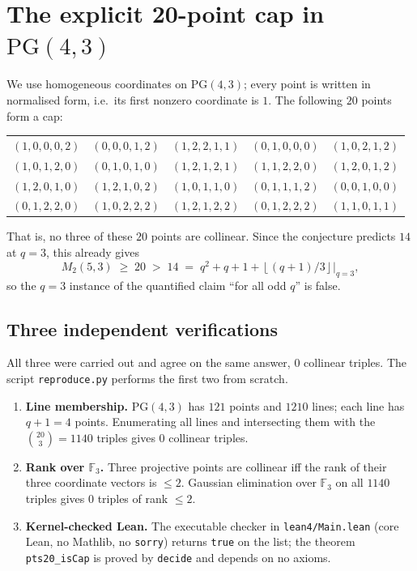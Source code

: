 \documentclass[11pt]{article}
\theoremstyle{definition}
\theoremstyle{remark}
\newcommand{\F}{\mathbb{F}}
\newcommand{\PG}{\mathrm{PG}}
\newcommand{\floor}[1]{\left\lfloor #1 \right\rfloor}
\begin{document}
\section{The explicit 20-point cap in $\PG(4,3)$}

We use homogeneous coordinates on $\PG(4,3)$; every point is written in
normalised form, i.e.\ its first nonzero coordinate is $1$. The following
$20$ points form a cap:
\begin{center}
\small
\begin{tabular}{lllll}
\toprule
$(1,0,0,0,2)$ & $(0,0,0,1,2)$ & $(1,2,2,1,1)$ & $(0,1,0,0,0)$ & $(1,0,2,1,2)$\\
$(1,0,1,2,0)$ & $(0,1,0,1,0)$ & $(1,2,1,2,1)$ & $(1,1,2,2,0)$ & $(1,2,0,1,2)$\\
$(1,2,0,1,0)$ & $(1,2,1,0,2)$ & $(1,0,1,1,0)$ & $(0,1,1,1,2)$ & $(0,0,1,0,0)$\\
$(0,1,2,2,0)$ & $(1,0,2,2,2)$ & $(1,2,1,2,2)$ & $(0,1,2,2,2)$ & $(1,1,0,1,1)$\\
\bottomrule
\end{tabular}
\end{center}

That is, no three of these $20$ points are collinear. Since the conjecture
predicts $14$ at $q=3$, this already gives
\[
M_{2}(5,3)\;\ge\;20\;>\;14\;=\;q^{2}+q+1+\floor{(q+1)/3}\big|_{q=3},
\]
so the $q=3$ instance of the quantified claim ``for all odd $q$'' is false.

\subsection{Three independent verifications}

All three were carried out and agree on the same answer, $0$ collinear
triples. The script \texttt{reproduce.py} performs the first two from scratch.

\begin{enumerate}
\item \textbf{Line membership.} $\PG(4,3)$ has $121$ points and $1210$ lines;
  each line has $q+1=4$ points. Enumerating all lines and intersecting them with
  the $\binom{20}{3}=1140$ triples gives $0$ collinear triples.
\item \textbf{Rank over $\F_{3}$.} Three projective points are collinear iff the
  rank of their three coordinate vectors is $\le 2$. Gaussian elimination over
  $\F_{3}$ on all $1140$ triples gives $0$ triples of rank $\le 2$.
\item \textbf{Kernel-checked Lean.} The executable checker in
  \texttt{lean4/Main.lean} (core Lean, no Mathlib, no \texttt{sorry}) returns
  \texttt{true} on the list; the theorem \texttt{pts20\_isCap} is proved by
  \texttt{decide} and depends on no axioms.
\end{enumerate}
\end{document}
